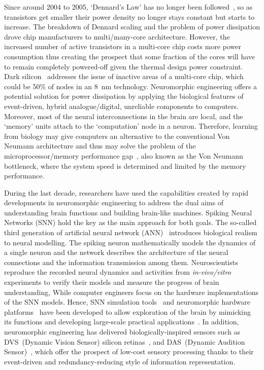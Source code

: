 Since around 2004 to 2005, `Dennard's Law' has no longer been followed~\cite{bohr200730}, so as transistors get smaller their power density no longer stays constant but starts to increase.
The breakdown of Dennard scaling and the problem of power dissipation drove chip manufacturers to multi/many-core architecture.
However, the increased number of active transistors in a multi-core chip costs more power consumption thus creating the prospect that some fraction of the cores will have to remain completely powered-off given the thermal design power constraint.
Dark silicon~\cite{esmaeilzadeh2011dark} addresses the issue of inactive areas of a multi-core chip, which could be 50\% of nodes in an 8~nm technology.
Neuromorphic engineering offers a potential solution for power dissipation by applying the biological features of event-driven, hybrid analogue/digital, unreliable components to computers.
Moreover, most of the neural interconnections in the brain are local, and the `memory' units attach to the `computation' node in a neuron.
Therefore, learning from biology may give computers an alternative to the conventional Von Neumann architecture and thus may solve the problem of the microprocessor/memory performance gap~\cite{wulf1995hitting}, also known as the Von Neumann bottleneck, where the system speed is determined and limited by the memory performance.



During the last decade, researchers have used the capabilities created by rapid developments in neuromorphic engineering to address the dual aims of understanding brain functions and building brain-like machines.
Spiking Neural Networks (SNN) hold the key as the main approach for both goals.
The so-called third generation of artificial neural network (ANN)~\cite{maass1997networks} introduces biological realism to neural modelling.
The spiking neuron mathematically models the dynamics of a single neuron and the network describes the architecture of the neural connections and the information transmission among them.
Neuroscientists reproduce the recorded neural dynamics and activities from \textit{in-vivo/vitro} experiments to verify their models and measure the progress of brain understanding, While computer engineers focus on the hardware implementations of the SNN models.
Hence, SNN simulation tools~\cite{davison2008pynn, gewaltig2007nest, goodman2008brian} and neuromorphic hardware platforms~\cite{furber2014spinnaker,  schemmel2010wafer,benjamin2014neurogrid,merolla2014million} have been developed to allow exploration of the brain by mimicking its functions and developing large-scale practical applications~\cite{eliasmith2012large}.
In addition, neuromorphic engineering has delivered biologically-inspired sensors such as DVS~(Dynamic Vision Sensor) silicon retinas~\cite{serrano2013128, delbruck2008frame, yang2015dynamic, posch2014retinomorphic}, and DAS~(Dynamic Audition Sensor)~\cite{5537164}, which offer the prospect of low-cost sensory processing thanks to their event-driven and redundancy-reducing style of information representation.

